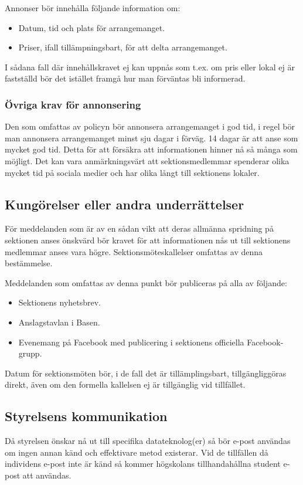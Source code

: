 Annonser bör innehålla följande information om:
\begin{itemize}
    \item Datum, tid och plats för arrangemanget.
    \item Priser, ifall tillämpningsbart, för att delta arrangemanget.
\end{itemize}
I sådana fall där innehållskravet ej kan uppnås som t.ex. om pris eller lokal ej är fastställd
bör det istället framgå hur man förväntas bli informerad.

\subsubsection{Övriga krav för annonsering}
Den som omfattas av policyn bör annonsera arrangemanget i god tid, i regel bör man
annonsera arrangemanget minst sju dagar i förväg. 14 dagar är att anse som mycket god
tid. Detta för att försäkra att informationen hinner nå så många som möjligt. Det kan vara
anmärkningsvärt att sektionsmedlemmar spenderar olika mycket tid på sociala medier och
har olika långt till sektionens lokaler.

\subsection{Kungörelser eller andra underrättelser}
För meddelanden som är av en sådan vikt att deras allmänna spridning på sektionen anses
önskvärd bör kravet för att informationen nås ut till sektionens medlemmar anses vara
högre. Sektionsmöteskallelser omfattas av denna bestämmelse.

Meddelanden som omfattas av denna punkt bör publiceras på alla av följande:
\begin{itemize}
    \item Sektionens nyhetsbrev.
    \item Anslagstavlan i Basen.
    \item Evenemang på Facebook med publicering i sektionens officiella Facebook-grupp.
\end{itemize}
Datum för sektionsmöten bör, i de fall det är tillämplingsbart, tillgängliggöras direkt, även
om den formella kallelsen ej är tillgänglig vid tillfället.

\subsection{Styrelsens kommunikation}
Då styrelsen önskar nå ut till specifika datateknolog(er) så bör e-post användas om ingen
annan känd och effektivare metod existerar. Vid de tillfällen då individens e-post inte är
känd så kommer högskolans tillhandahållna student e-post att användas.

